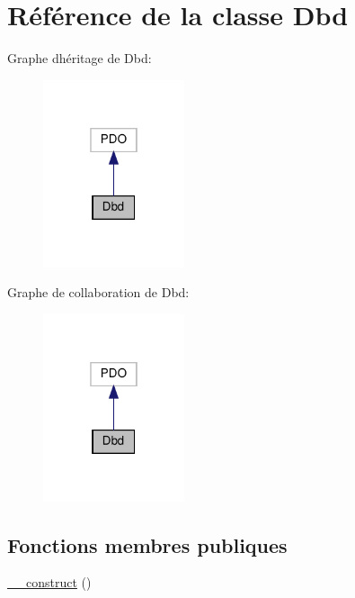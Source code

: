 \hypertarget{class_app_1_1_dbd}{}\section{Référence de la classe Dbd}
\label{class_app_1_1_dbd}


Graphe d\textquotesingle{}héritage de Dbd\+:
\nopagebreak
\begin{figure}[H]
\begin{center}
\leavevmode
\includegraphics[width=118pt]{d0/da9/class_app_1_1_dbd__inherit__graph}
\end{center}
\end{figure}


Graphe de collaboration de Dbd\+:
\nopagebreak
\begin{figure}[H]
\begin{center}
\leavevmode
\includegraphics[width=118pt]{d7/d09/class_app_1_1_dbd__coll__graph}
\end{center}
\end{figure}
\subsection*{Fonctions membres publiques}
\begin{DoxyCompactItemize}
\item 
\hyperlink{class_app_1_1_dbd_a095c5d389db211932136b53f25f39685}{\+\_\+\+\_\+construct} ()
\end{DoxyCompactItemize}


